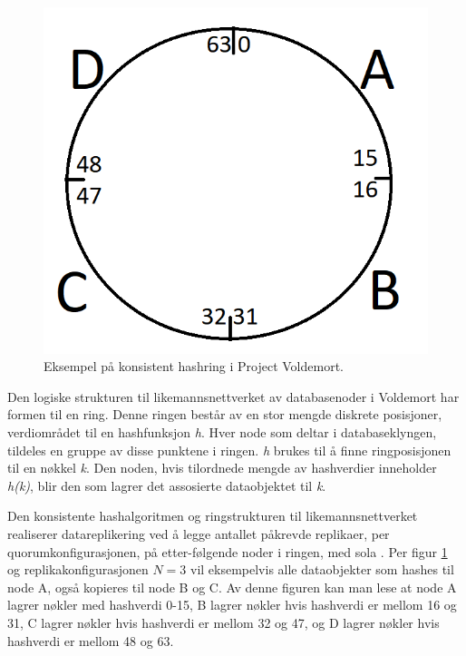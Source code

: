 \begin{figure}[!ht]
    \centering
    \includegraphics{fig/hashring.png}
    \caption{Eksempel på konsistent hashring i Project Voldemort.}
    \label{fig4}
\end{figure}

Den logiske strukturen til likemannsnettverket av databasenoder i Voldemort har formen til en ring. Denne ringen består av en stor mengde diskrete posisjoner, verdiområdet til en hashfunksjon \emph{h}. Hver node som deltar i databaseklyngen, tildeles en gruppe av disse punktene i ringen. \emph{h} brukes til å finne ringposisjonen til en nøkkel \emph{k}. Den noden, hvis tilordnede mengde av hashverdier inneholder \emph{h(k)}, blir den som lagrer det assosierte dataobjektet til \emph{k}.

Den konsistente hashalgoritmen og ringstrukturen til likemannsnettverket realiserer datareplikering ved å legge antallet påkrevde replikaer, per quorumkonfigurasjonen, på etter-følgende noder i ringen, med sola \citep{elmasri2014}. Per figur \ref{fig4} og replikakonfigurasjonen \(N=3\) vil eksempelvis alle dataobjekter som hashes til node A, også kopieres til node B og C. Av denne figuren kan man lese at node A lagrer nøkler med hashverdi 0-15, B lagrer nøkler hvis hashverdi er mellom 16 og 31, C lagrer nøkler hvis hashverdi er mellom 32 og 47, og D lagrer nøkler hvis hashverdi er mellom 48 og 63.

